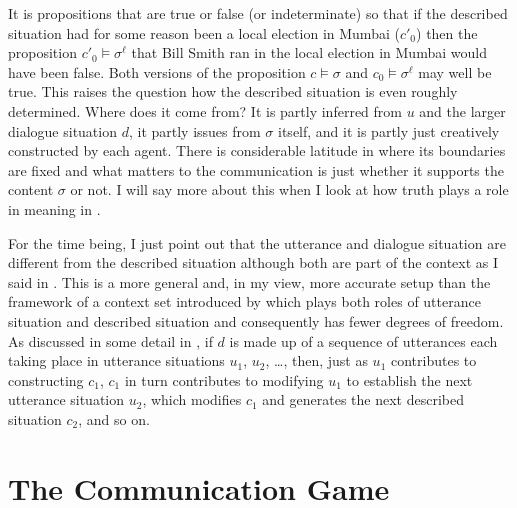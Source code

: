 It is propositions that are true or false (or indeterminate) so that if the described situation had for some reason been a local election in Mumbai ($c'_0$) then the proposition $c'_0 \vDash \sigma^{\ell}$ that Bill Smith ran in the local election in Mumbai would have been false. Both versions of the proposition $c \vDash \sigma$ and $c_0 \vDash \sigma^{\ell}$ may well be true. This raises the question how the described situation is even roughly determined. Where does it come from? It is partly inferred from $u$ and the larger dialogue situation $d$, it partly issues from $\sigma$ itself, and it is partly just creatively constructed by each agent. There is considerable latitude in where its boundaries are fixed and what matters to the communication is just whether it supports the content $\sigma$ or not. I will say more about this when I look at how truth plays a role in meaning in .

For the time being, I just point out that the utterance and dialogue situation are different from the described situation although both are part of the context as I said in . This is a more general and, in my view, more accurate setup than the framework of a context set introduced by \citet{stalnaker:orc} which plays both roles of utterance situation and described situation and consequently has fewer degrees of freedom. As discussed in some detail in \citet[65--66]{parikh:le}, if $d$ is made up of a sequence of utterances each taking place in utterance situations $u_1$, $u_2$, \ldots , then, just as $u_1$ contributes to constructing $c_1$, $c_1$ in turn contributes to modifying $u_1$ to establish the next utterance situation $u_2$, which modifies $c_1$ and generates the next described situation $c_2$, and so on.


\section{The Communication Game} \label{sec:communication game}\largerpage


